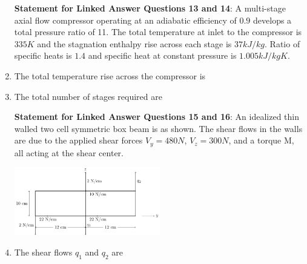 \documentclass[journal,12pt,onecolumn]{IEEEtran}
\theoremstyle{remark}
\begin{document}
\begin{enumerate}
\textbf{Statement for Linked Answer Questions 13 and 14}: A multi-stage axial flow compressor operating at an adiabatic efficiency of $0.9$ develops a total pressure ratio of 11. The total temperature at inlet to the compressor is $335K$ and the stagnation enthalpy rise across each stage is $37 kJ/kg$. Ratio of specific heats is $1.4$ and specific heat at constant pressure is $1.005 kJ/kg K$.
\item The total temperature rise across the compressor is
\begin{enumerate}
\end{enumerate}

\item The total number of stages required are
\begin{enumerate}
\end{enumerate}

\textbf{Statement for Linked Answer Questions 15 and 16}: An idealized thin walled two cell symmetric box beam is as shown. The shear flows in the walls are due to the applied shear forces $V_{y} = 480 N$, $V_{z} = 300 N$, and a torque M, all acting at the shear center.

\includegraphics[width=0.5\textwidth]{figs/fig2/fig2.pdf}


\item The shear flows $q_{1}$ and $q_{2}$ are
\begin{enumerate}
\end{enumerate}
\end{enumerate}
\end{document}
